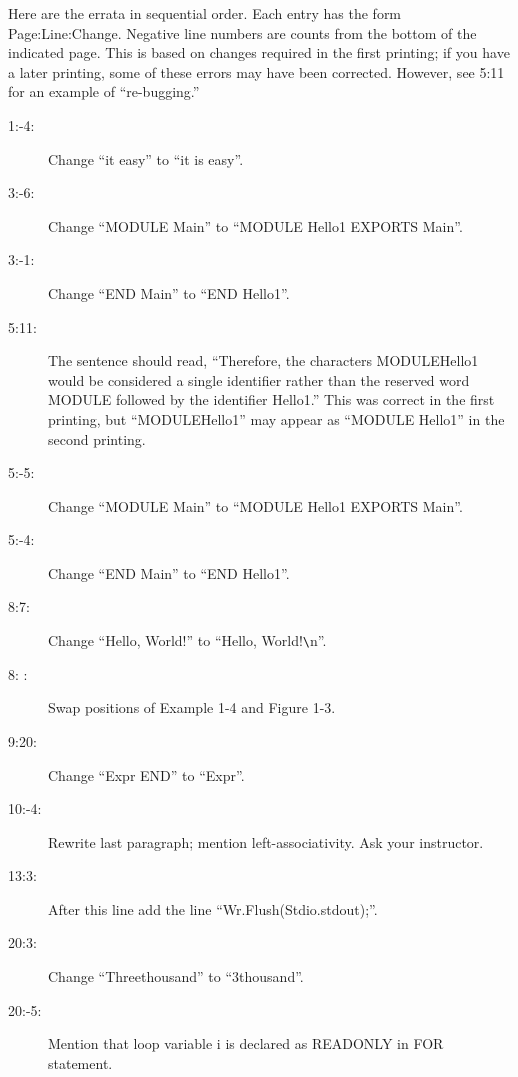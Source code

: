 \noindent
Here are the errata in sequential order.
Each entry has the form Page:Line:Change.
Negative line numbers are counts from the bottom of the indicated page.
This is based on changes required in the first
printing; if you have a later printing, some of these errors may have
been corrected.  However, see 5:11 for an example of ``re-bugging.''
\begin{description}
\item[1:-4:] Change ``it easy'' to ``it is easy''.

\item[3:-6:] Change ``{\sf MODULE Main}'' to
``{\sf MODULE Hello1 EXPORTS Main}''.

\item[3:-1:] Change ``{\sf END Main}'' to ``{\sf END Hello1}''.

\item[5:11:] The sentence should read, ``Therefore, the characters
{\sf MODULEHello1}
would be considered a single identifier rather than the reserved 
word {\sf MODULE} followed by the identifier {\sf Hello1}.''  This was correct 
in the first printing, but ``{\sf MODULEHello1}''
may appear as ``{\sf MODULE Hello1}''
in the second printing.

\item[5:-5:] Change ``{\sf MODULE Main}''
to ``{\sf MODULE Hello1 EXPORTS Main}''.

\item[5:-4:] Change ``{\sf END Main}'' to ``{\sf END Hello1}''.

\item[8:7:] Change ``{\sf Hello, World!}'' to
``{\sf Hello, World!}\verb+\+{\sf n}''.

\item[8: :] Swap positions of Example 1-4 and Figure 1-3.

\item[9:20:] Change ``{\sf Expr END}'' to ``{\sf Expr}''.

\item[10:-4:] Rewrite last paragraph; mention left-associativity.
Ask your instructor.

\item[13:3:] After this line add the line ``{\sf Wr.Flush(Stdio.stdout);}''.

\item[20:3:] Change ``{\sf Threethousand}'' to ``{\sf 3thousand}''.

\item[20:-5:] Mention that loop variable {\sf i} is declared as {\sf READONLY}
in {\sf FOR} statement.


\end{description}

